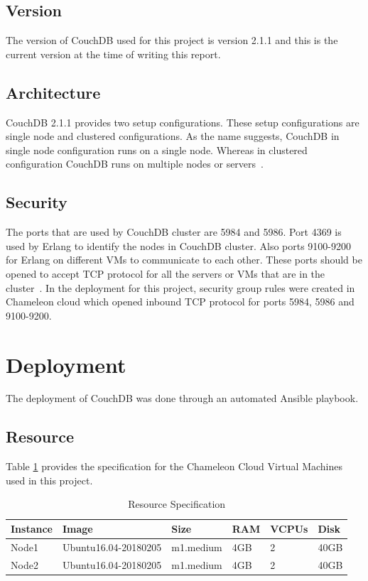 \subsection{Version}
The version of CouchDB used for this project is version 2.1.1 and this
is the current version at the time of writing this report.

\subsection{Architecture}
CouchDB 2.1.1 provides two setup configurations. These setup
configurations are single node and clustered configurations. As the
name suggests, CouchDB in single node configuration runs on a single
node. Whereas in clustered configuration CouchDB runs on multiple
nodes or servers~\cite{www-Couchdb, www-CouchdbOverview}.

\subsection{Security}
The ports that are used by CouchDB cluster are 5984 and 5986. Port
4369 is used by Erlang to identify the nodes in CouchDB cluster. Also
ports 9100-9200 for Erlang on different VMs to communicate to each
other. These ports should be opened to accept TCP protocol for all the
servers or VMs that are in the cluster~\cite{www-CouchdbSetup}. 
In the deployment for this project, security group rules were
created in Chameleon cloud which opened inbound TCP protocol for ports
5984, 5986 and 9100-9200.


\section{Deployment}
The deployment of CouchDB  was done through an automated Ansible
playbook. 
\subsection{Resource}
Table \ref{t:resource-specification} provides the specification for
the Chameleon Cloud Virtual Machines used in this project.

\begin{table}[]
\centering
\caption{Resource Specification}
\label{t:resource-specification}
\begin{tabular}{|l|l|l|l|l|l|}
\hline
\textbf{Instance} & \textbf{Image}       & \textbf{Size} & \textbf{RAM} & \textbf{VCPUs} & \textbf{Disk} \\ \hline
Node1             & Ubuntu16.04-20180205 & m1.medium     & 4GB          & 2              & 40GB          \\ \hline
Node2             & Ubuntu16.04-20180205 & m1.medium     & 4GB          & 2              & 40GB          \\ \hline
\end{tabular}
\end{table}

